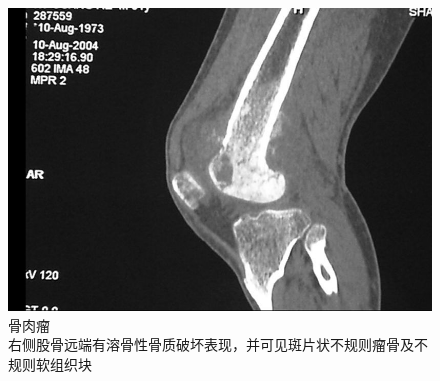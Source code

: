 \begin{figure}[!htbp]
 \centering
 \includegraphics[width=.7\textwidth,height=\textheight,keepaspectratio]{./images/Image00440.jpg}
 \captionsetup{justification=centering}
 \caption{骨肉瘤\\{\small 右侧股骨远端有溶骨性骨质破坏表现，并可见斑片状不规则瘤骨及不规则软组织块}}
 \label{fig22-21}
  \end{figure} 

